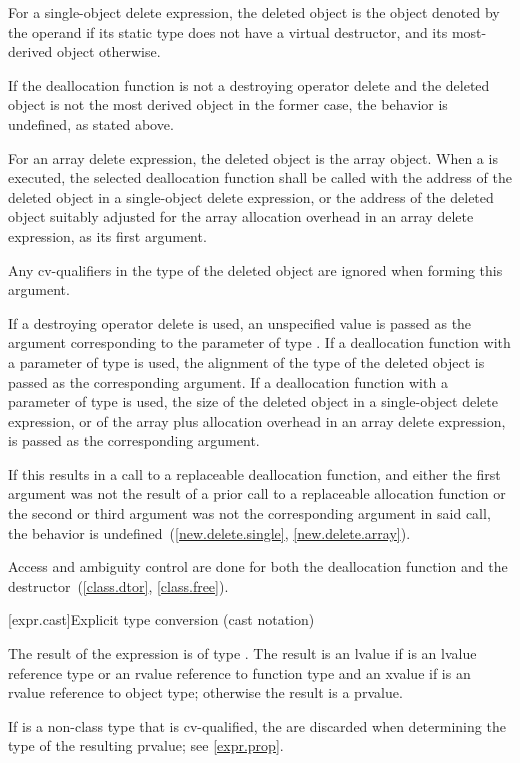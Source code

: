 \pnum
For a single-object delete expression,
the deleted object is
the object denoted by the operand
if its static type does not have a virtual destructor,
and its most-derived object otherwise.
\begin{note}
If the deallocation function is not a destroying operator delete
and the deleted object is not the most derived object in the former case,
the behavior is undefined,
as stated above.
\end{note}
For an array delete expression,
the deleted object is
the array object.
When a 
is executed, the selected deallocation function shall be called with
the address of the deleted object
in a single-object delete expression, or
the address of the deleted object
suitably adjusted for the array allocation
overhead in an array delete expression,
as its first argument.
\begin{note}
Any cv-qualifiers in the type of the deleted object
are ignored when forming this argument.
\end{note}
If a destroying operator delete is used,
an unspecified value
is passed as the argument
corresponding to the parameter of type .
If a deallocation function
with a parameter of type 
is used,
the alignment of the type of the deleted object
is passed as the corresponding argument.
If a deallocation function
with a parameter of type  is used,
the size of the deleted object
in a single-object delete expression, or
of the array plus allocation overhead
in an array delete expression,
is passed as the corresponding argument.
\begin{note}
If this results in a call to a replaceable deallocation function,
and either
the first argument was not the result of
a prior call to a replaceable allocation function or
the second or third argument was not the corresponding argument in said call,
the behavior is undefined~(\ref{new.delete.single}, \ref{new.delete.array}).
\end{note}

\pnum
Access and ambiguity control are done for both the deallocation function
and the destructor~(\ref{class.dtor}, \ref{class.free}).

[expr.cast]{Explicit type conversion (cast notation)}%

\pnum
The result of the expression   is
of type . The result is an lvalue if  is an lvalue
reference type or an rvalue reference to function type and an xvalue if 
is an rvalue reference to object type; otherwise the result is a prvalue.
\begin{note}
If  is a non-class type that is cv-qualified, the
 are discarded when determining the type of the
resulting prvalue; see \ref{expr.prop}.
\end{note}

